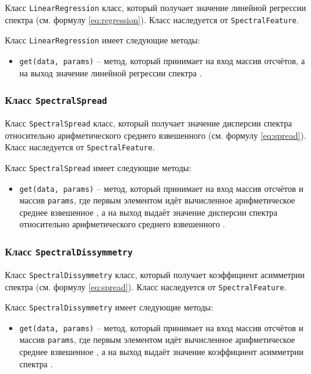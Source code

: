 Класс \texttt{LinearRegression} класс, который получает значение линейной регрессии спектра  (см. формулу \ref{eq:regression}). Класс наследуется от \texttt{SpectralFeature}.

Класс \texttt{LinearRegression} имеет следующие методы:

\begin{itemize}
\item{\texttt{get(data, params)} --  метод, который принимает на вход массив отсчётов, а на выход  значение линейной регрессии спектра . }
\end{itemize}

\subsubsection{Класс \texttt{SpectralSpread}}

Класс \texttt{SpectralSpread} класс, который получает значение дисперсии спектра относительно арифметического среднего взвешенного (см. формулу \ref{eq:spread}). Класс наследуется от \texttt{SpectralFeature}.

Класс \texttt{SpectralSpread} имеет следующие методы:

\begin{itemize}
\item{\texttt{get(data, params)} --  метод, который принимает на вход массив отсчётов и массив \texttt{params}, где первым элементом идёт вычисленное арифметическое среднее взвешенное , а на выход выдаёт значение  дисперсии спектра относительно арифметического среднего взвешенного . }
\end{itemize}



\subsubsection{Класс \texttt{SpectralDissymmetry}}

Класс \texttt{SpectralDissymmetry} класс, который получает коэффициент асимметрии спектра (см. формулу \ref{eq:spread}). Класс наследуется от \texttt{SpectralFeature}.

Класс \texttt{SpectralDissymmetry} имеет следующие методы:

\begin{itemize}
\item{\texttt{get(data, params)} --  метод, который принимает на вход массив отсчётов и массив \texttt{params}, где первым элементом идёт вычисленное арифметическое среднее взвешенное , а на выход выдаёт значение коэффициент асимметрии спектра . }
\end{itemize}




